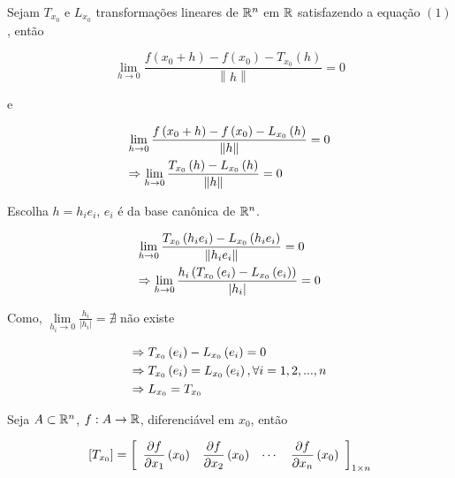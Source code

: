 \documentclass{book}
\begin{document}
\begin{dem}
    Sejam ${T_{x_0 } }$ e ${L_{x_0 } }$ transforma\c c\~oes lineares de $\mathbb{R}^n$ em $\mathbb{R}$ satisfazendo a equa\c c\~ao $(1)$, ent\~ao

\[
    \mathop {\lim }\limits_{h \to 0} \frac{{f\left( {x_0  + h} \right) - f\left( {x_0 } \right) - T_{x_0 } \left( h \right)}}{{\left\| h \right\|}} = 0
\]

e

\[
\begin{gathered}
      \mathop {\lim }\limits_{h \to 0} \frac{{f\left( {x_0  + h} \right) - f\left( {x_0 } \right) - L_{x_0 } \left( h \right)}}{{\left\| h \right\|}} = 0 \hfill \\
       \Rightarrow \mathop {\lim }\limits_{h \to 0} \frac{{T_{x_0 } \left( h \right) - L_{x_0 } \left( h \right)}}{{\left\| h \right\|}} = 0 \hfill \\
\end{gathered}
\]

Escolha $h = h_i e_i$, $e_i$ \'e da base can\^onica de $\mathbb{R}^n$.

\[
\begin{gathered}
      \mathop {\lim }\limits_{h \to 0} \frac{{T_{x_0 } \left( {h_i e_i } \right) - L_{x_0 } \left( {h_i e_i } \right)}}{{\left\| {h_i e_i } \right\|}} = 0 \hfill \\
       \Rightarrow \mathop {\lim }\limits_{h \to 0} \frac{{h_i \left( {T_{x_0 } \left( {e_i } \right) - L_{x_0 } \left( {e_i } \right)} \right)}}{{\left| {h_i } \right|}} = 0 \hfill \\
\end{gathered}
\]

    Como, $\mathop {\lim }\limits_{h_i  \to 0} \frac{{h_i }}{{\left| {h_i } \right|}} = \nexists$ n\~ao existe

\[
\begin{gathered}
   \Rightarrow T_{x_0 } \left( {e_i } \right) - L_{x_0 } \left( {e_i } \right) = 0 \hfill \\
   \Rightarrow T_{x_0 } \left( {e_i } \right) = L_{x_0 } \left( {e_i } \right),\forall i = 1,2,...,n \hfill \\
\Rightarrow L_{x_0 }  = T_{x_0 }  \hfill \\
\end{gathered}
\]

\end{dem}

\begin{teo}
    Seja $A \subset \mathbb{R}^n$, $f:A \to \mathbb{R}$, diferenci\'avel em $x_0$, ent\~ao

\[
\left[ {T_{x_0 } } \right] = \left[ {\begin{array}{*{20}c}\displaystyle
    {\frac{{\partial f}}{{\partial x_1 }}\left( {x_0 } \right)} & \displaystyle {\frac{{\partial f}}{{\partial x_2 }}\left( {x_0 } \right)} &  \cdots  & \displaystyle {\frac{{\partial f}}{{\partial x_n }}\left( {x_0 } \right)}  \\
\end{array} } \right]_{1 \times n}
\]

\end{teo}
\end{document}
